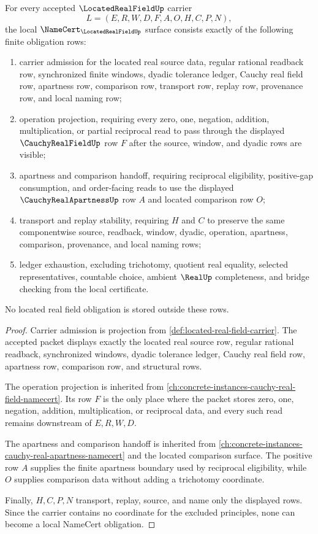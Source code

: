 \begin{theorem}
\label{thm:located-real-field-namecert-obligations}
For every accepted $\LocatedRealFieldUp$ carrier
$$
L=(E,R,W,D,F,A,O,H,C,P,N),
$$
the local $\NameCert_{\LocatedRealFieldUp}$ surface consists exactly of the following finite obligation rows:
\begin{enumerate}
\item carrier admission for the located real source data, regular rational readback row, synchronized finite windows, dyadic tolerance ledger, Cauchy real field row, apartness row, comparison row, transport row, replay row, provenance row, and local naming row;
\item operation projection, requiring every zero, one, negation, addition, multiplication, or partial reciprocal read to pass through the displayed $\CauchyRealFieldUp$ row $F$ after the source, window, and dyadic rows are visible;
\item apartness and comparison handoff, requiring reciprocal eligibility, positive-gap consumption, and order-facing reads to use the displayed $\CauchyRealApartnessUp$ row $A$ and located comparison row $O$;
\item transport and replay stability, requiring $H$ and $C$ to preserve the same componentwise source, readback, window, dyadic, operation, apartness, comparison, provenance, and local naming rows;
\item ledger exhaustion, excluding trichotomy, quotient real equality, selected representatives, countable choice, ambient $\RealUp$ completeness, and bridge checking from the local certificate.
\end{enumerate}
No located real field obligation is stored outside these rows.
\end{theorem}
\begin{proof}
Carrier admission is projection from \autoref{def:located-real-field-carrier}. The accepted packet displays exactly the located real source row, regular rational readback, synchronized windows, dyadic tolerance ledger, Cauchy real field row, apartness row, comparison row, and structural rows.

The operation projection is inherited from \autoref{ch:concrete-instances-cauchy-real-field-namecert}. Its row $F$ is the only place where the packet stores zero, one, negation, addition, multiplication, or reciprocal data, and every such read remains downstream of $E,R,W,D$.

The apartness and comparison handoff is inherited from \autoref{ch:concrete-instances-cauchy-real-apartness-namecert} and the located comparison surface. The positive row $A$ supplies the finite apartness boundary used by reciprocal eligibility, while $O$ supplies comparison data without adding a trichotomy coordinate.

Finally, $H,C,P,N$ transport, replay, source, and name only the displayed rows. Since the carrier contains no coordinate for the excluded principles, none can become a local NameCert obligation.
\end{proof}

